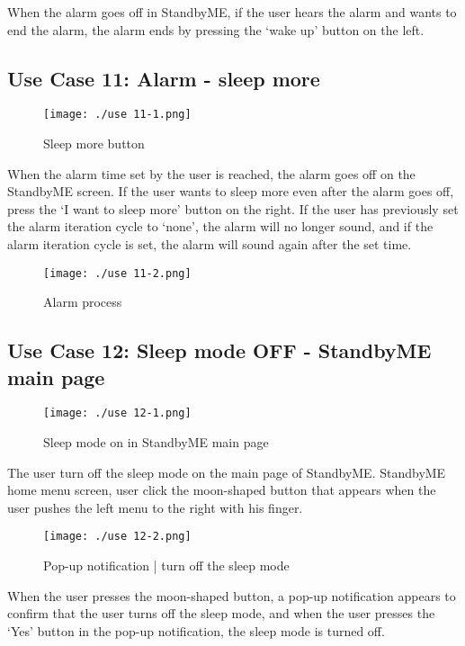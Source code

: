 \documentclass[conference]{IEEEtran}
\begin{document}
When the alarm goes off in StandbyME, if the user hears the alarm and wants to end the alarm, the alarm ends by pressing the ‘wake up' button on the left.

\subsection{Use Case 11: Alarm - sleep more}

\begin{figure}[H]
\texttt{[image: ./use 11-1.png]}
\centering
\caption{Sleep more button}
\end{figure}

When the alarm time set by the user is reached, the alarm goes off on the StandbyME screen. If the user wants to sleep more even after the alarm goes off, press the ‘I want to sleep more' button on the right. If the user has previously set the alarm iteration cycle to ‘none', the alarm will no longer sound, and if the alarm iteration cycle is set, the alarm will sound again after the set time.

\begin{figure}[H]
\texttt{[image: ./use 11-2.png]}
\centering
\caption{Alarm process}
\end{figure}

\subsection{Use Case 12: Sleep mode OFF - StandbyME main page}

\begin{figure}[H]
\texttt{[image: ./use 12-1.png]}
\centering
\caption{Sleep mode on in StandbyME main page}
\end{figure}

The user turn off the sleep mode on the main page of StandbyME. StandbyME home menu screen, user click the moon-shaped button that appears when the user pushes the left menu to the right with his finger.

\begin{figure}[H]
\texttt{[image: ./use 12-2.png]}
\centering
\caption{Pop-up notification | turn off the sleep mode}
\end{figure}

When the user presses the moon-shaped button, a pop-up notification appears to confirm that the user turns off the sleep mode, and when the user presses the ‘Yes' button in the pop-up notification, the sleep mode is turned off.
\end{document}
